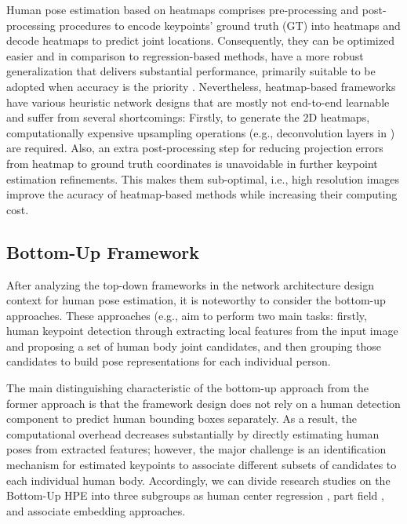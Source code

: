 Human pose estimation based on heatmaps comprises pre-processing and post-processing procedures to encode keypoints' ground truth (GT) into heatmaps and decode heatmaps to predict joint locations. Consequently, they can be optimized easier and in comparison to regression-based methods, have a more robust generalization that delivers substantial performance, primarily suitable to be adopted when accuracy is the priority \cite{pfister_flowing_2015}. Nevertheless, heatmap-based frameworks have various heuristic network designs that are mostly not end-to-end learnable and suffer from several shortcomings: Firstly, to generate the 2D heatmaps, computationally expensive upsampling operations (e.g., deconvolution layers in \cite{yixing_gao_user_2015}) are required. Also, an extra post-processing step for reducing projection errors from heatmap to ground truth coordinates is unavoidable in further keypoint estimation refinements. This makes them sub-optimal, i.e., high resolution images improve the acuracy of heatmap-based methods while increasing their computing cost. 


\subsection{Bottom-Up Framework}
 
After analyzing the top-down frameworks in the network architecture design context for human pose estimation, it is noteworthy to consider the bottom-up approaches. These approaches (e.g.,\cite{micilotta_real-time_2006, cheng_higherhrnet_2020, fieraru_learning_2018, jin_differentiable_2020, kreiss_pifpaf_2019, nie_single-stage_2019,insafutdinov_arttrack_2017, insafutdinov_deepercut_2016, newell_associative_2017, pishchulin_deepcut_2016, tian_directpose_2019} aim to perform two main tasks: firstly, human keypoint detection through extracting local features from the input image and proposing a set of human body joint candidates, and then grouping those candidates to build pose representations for each individual person. 

The main distinguishing characteristic of the bottom-up approach from the former approach is that the framework design does not rely on a human detection component to predict human bounding boxes separately. As a result, the computational overhead decreases substantially by directly estimating human poses from extracted features; however, the major challenge is an identification mechanism for estimated keypoints to associate different subsets of candidates to each individual human body. Accordingly, we can divide research studies on the Bottom-Up HPE into three subgroups as human center regression \cite{geng_bottom-up_2021, nie_single-stage_2019, nie_human_2018}, part field \cite{jin_differentiable_2020, kreiss_pifpaf_2019, martinez_single-network_2019, insafutdinov_deepercut_2016, li_simple_2019}, and associate embedding \cite{cheng_higherhrnet_2020, jin_multi-person_2019, luo_rethinking_2021, newell_associative_2017} approaches. 

